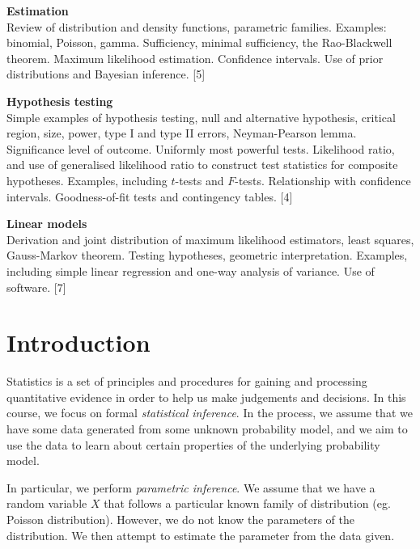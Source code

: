 \documentclass[a4paper]{article}
\begin{document}
\maketitle
{\small
\noindent\textbf{Estimation}\\
Review of distribution and density functions, parametric families. Examples: binomial, Poisson, gamma. Sufficiency, minimal sufficiency, the Rao-Blackwell theorem. Maximum likelihood estimation. Confidence intervals. Use of prior distributions and Bayesian inference.\hspace*{\fill} [5]

\vspace{10pt}
\noindent\textbf{Hypothesis testing}\\
Simple examples of hypothesis testing, null and alternative hypothesis, critical region, size, power, type I and type II errors, Neyman-Pearson lemma. Significance level of outcome. Uniformly most powerful tests. Likelihood ratio, and use of generalised likelihood ratio to construct test statistics for composite hypotheses. Examples, including $t$-tests and $F$-tests. Relationship with confidence intervals. Goodness-of-fit tests and contingency tables.\hspace*{\fill} [4]

\vspace{10pt}
\noindent\textbf{Linear models}\\
Derivation and joint distribution of maximum likelihood estimators, least squares, Gauss-Markov theorem. Testing hypotheses, geometric interpretation. Examples, including simple linear regression and one-way analysis of variance. Use of software.\hspace*{\fill} [7]}

\tableofcontents

\setcounter{section}{-1}
\section{Introduction}
Statistics is a set of principles and procedures for gaining and processing quantitative evidence in order to help us make judgements and decisions. In this course, we focus on formal \emph{statistical inference}. In the process, we assume that we have some data generated from some unknown probability model, and we aim to use the data to learn about certain properties of the underlying probability model.

In particular, we perform \emph{parametric inference}. We assume that we have a random variable $X$ that follows a particular known family of distribution (eg. Poisson distribution). However, we do not know the parameters of the distribution. We then attempt to estimate the parameter from the data given.
\end{document}

